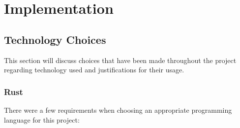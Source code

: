 \chapter{Implementation} \label{cha:chapter3}

\section{Technology Choices} \label{sec:chap3:technology}
This section will discuss choices that have been made throughout the project regarding technology used and justifications for their usage.

\subsection{Rust} \label{sec:chap3:technology:rust}
There were a few requirements when choosing an appropriate programming language for this project:
